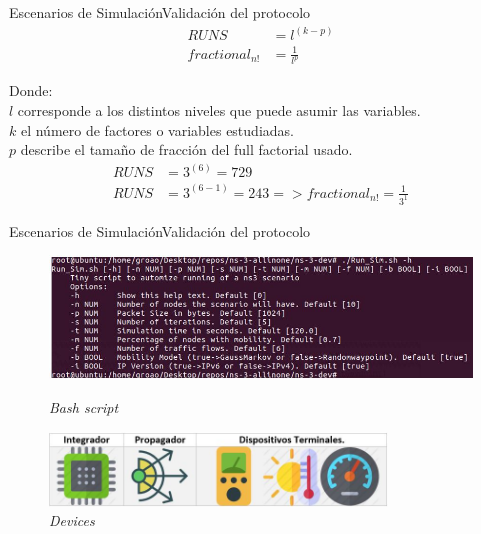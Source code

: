 \begin{frame}{Escenarios de Simulación}{Validación del protocolo}
\begin{align}
RUNS &= l^{(k-p)}  \label{eqn5}\\
fractional_{n!} &= \frac{1}{l^{p}}  \label{eqn6}
\end{align}

Donde:\\
$l$ corresponde a los distintos niveles que puede asumir las variables.\\
$k$ el número de factores o variables estudiadas.\\
$p$ describe el tamaño de fracción del full factorial usado.\\

\begin{align*}
RUNS &= 3^{(6)} = 729  \\
RUNS &= 3^{(6-1)} = 243 => fractional_{n!} = \frac{1}{3^{1}}
\end{align*}
\end{frame}
\begin{frame}{Escenarios de Simulación}{Validación del protocolo}
    \begin{figure}				
		\includegraphics[width=1.\textwidth,height=1.\textheight,keepaspectratio]{Figures/Bash.JPG}
		\caption{\small \sl Bash script}
		\label{figure:Bash}
		\includegraphics[width=0.8\textwidth,height=0.8\textheight,keepaspectratio]{Figures/Devices.JPG}
		\caption{\small \sl Devices}
		\label{figure:Devices}
    \end{figure}
\end{frame}
